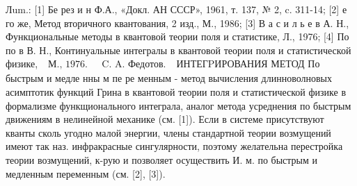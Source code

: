 \documentclass[10pt]{article}
\begin{document}
Лum.: [1] Бе рез и н Ф.А., «Докл. АН СССР», 1961, т. 137, № 2, c. 311-14; [2] е го же, Метод вторичного квантования, 2 изд., М., 1986; [3] В а с и л ь е в А. Н., Функциональные методы в квантовой теории поля и статистике, Л., 1976; [4] По по в В. Н., Континуальные интегралы в квантовой теории поля и статистической физике, $\begin{array}{ll}\text { М., 1976. } & \text { C. A. Федотов. }\end{array}$ ИНТЕГPИРОВАНИЯ МЕТОД По быстрым и медле нны м пе ре менным - метод вычисления длинноволновых асимптотик функций Грина в квантовой теории поля и статистической физике в формализме функщионального интеграла, аналог метода усреднения по быстрым движениям в нелинейной механике (см. [1]). Если в системе присутствуют кванты сколь угодно малой энергии, члены стандартной теории возмущений имеют так наз. инфракрасные сингулярности, поэтому желательна перестройка теории возмущений, к-рую и позволяет осуществить И. м. по быстрым и медленным переменным (см. [2], [3]).
\end{document}
